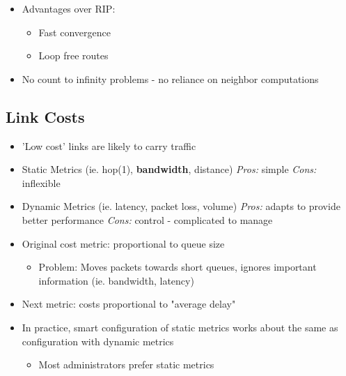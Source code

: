 \documentclass[11pt]{article}
\begin{document}
\begin{itemize}
\item Advantages over RIP: 
\begin{itemize}
\item Fast convergence
\item Loop free routes
\end{itemize}
\item No count to infinity problems - no reliance on neighbor computations
\end{itemize}

\subsection{Link Costs}
\label{sec:orgheadline90}
\begin{itemize}
\item 'Low cost' links are likely to carry traffic

\item Static Metrics (ie. hop(1), \textbf{bandwidth}, distance)
\emph{Pros:} simple
\emph{Cons:} inflexible
\item Dynamic Metrics (ie. latency, packet loss, volume)
\emph{Pros:} adapts to provide better performance
\emph{Cons:} control - complicated to manage

\item Original cost metric: proportional to queue size
\begin{itemize}
\item Problem: Moves packets towards short queues, ignores important
information (ie. bandwidth, latency)
\end{itemize}
\item Next metric: costs proportional to "average delay"

\item In practice, smart configuration of static metrics works about the
same as configuration with dynamic metrics
\begin{itemize}
\item Most administrators prefer static metrics
\end{itemize}
\end{itemize}
\end{document}

